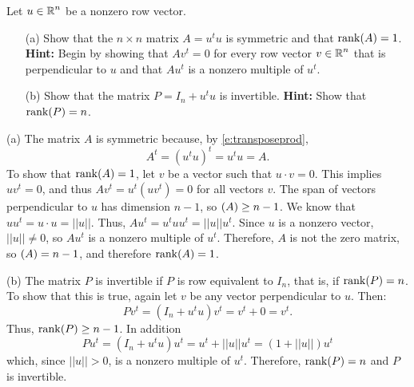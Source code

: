 \documentclass{ximera}
\begin{document}
\begin{exercise} \label{c5.5.7}
Let $u\in\mbox{$\Bbb{R}$}^n$ be a nonzero row vector.
\begin{itemize}
\item[(a)] Show that the $n\times n$ matrix $A=u^tu$ is symmetric and
  that ${\rm rank}(A)=1$.  {\bf Hint:} Begin by showing that $Av^t=0$ for
  every row vector $v\in\mbox{$\Bbb{R}$}^n$ that is perpendicular to $u$ and that
  $Au^t$ is a nonzero multiple of $u^t$.
\item[(b)]  Show that the matrix $P=I_n+u^tu$ is invertible.  {\bf Hint:}
Show that ${\rm rank}(P)=n$.
\end{itemize}

\begin{solution}

(a) The matrix $A$ is symmetric because, by \eqref{e:transposeprod},
\[
A^t = (u^tu)^t = u^tu = A.
\]
To show that ${\rm rank}(A) = 1$, let $v$ be a vector such that $u \cdot
v = 0$.  This implies $uv^t = 0$, and thus $Av^t = u^t(uv^t) = 0$
for all vectors $v$.  The span of vectors perpendicular to $u$ has
dimension $n - 1$, so $\null(A) \geq n - 1$.  We know that $uu^t
= u \cdot u = ||u||$.  Thus, $Au^t = u^tuu^t = ||u||u^t$.  Since
$u$ is a nonzero vector, $||u|| \neq 0$, so $Au^t$ is a nonzero
multiple of $u^t$.  Therefore, $A$ is not the zero matrix, so
$\null(A) = n - 1$, and therefore ${\rm rank}(A) = 1$.

(b) The matrix $P$ is invertible if $P$ is row equivalent to $I_n$,
that is, if ${\rm rank}(P) = n$.  To show that this is true, again let $v$
be any vector perpendicular to $u$.  Then:
\[
Pv^t = (I_n + u^tu)v^t = v^t + 0 = v^t.
\]
Thus, ${\rm rank}(P) \geq n - 1$.  In addition
\[
Pu^t = (I_n + u^tu)u^t = u^t + ||u||u^t = (1 + ||u||)u^t
\]
which, since $||u|| > 0$, is a nonzero multiple of $u^t$.  Therefore,
${\rm rank}(P) = n$ and $P$ is invertible.



\end{solution}
\end{exercise}
\end{document}
